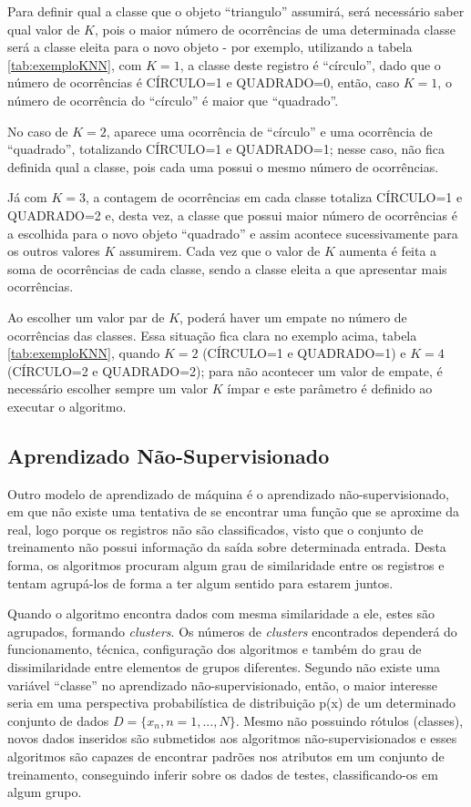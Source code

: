  
Para definir qual a classe que o objeto ``triangulo'' assumirá, será necessário saber qual valor de ${K}$, pois o maior número de ocorrências de uma determinada classe será a classe eleita para o novo objeto - por exemplo, utilizando a tabela \ref{tab:exemploKNN}, com ${K=1}$, a classe deste registro é “círculo”, dado que o número de ocorrências é CÍRCULO=1 e QUADRADO=0, então, caso ${K=1}$, o número de ocorrência do “círculo” é maior que ``quadrado''. 

No caso de ${K=2}$, aparece uma ocorrência de “círculo” e uma ocorrência de “quadrado”, totalizando CÍRCULO=1 e QUADRADO=1; nesse caso, não fica definida qual a classe, pois cada uma possui o mesmo número de ocorrências. 

Já com ${K=3}$, a contagem de ocorrências em cada classe totaliza CÍRCULO=1 e QUADRADO=2 e, desta vez, a classe que possui maior número de ocorrências é a escolhida para o novo objeto ``quadrado'' e assim acontece sucessivamente para os outros valores ${K}$ assumirem. Cada vez que o valor de ${K}$ aumenta é feita a soma de ocorrências de cada classe, sendo a classe eleita a que apresentar mais ocorrências. 
 

Ao escolher um valor par de ${K}$, poderá haver um empate no número de ocorrências das classes. Essa situação fica clara no exemplo acima, tabela \ref{tab:exemploKNN}, quando ${K=2}$  (CÍRCULO=1 e QUADRADO=1) e ${K=4}$  (CÍRCULO=2 e QUADRADO=2); para não acontecer um valor de empate, é necessário escolher sempre um valor ${K}$ ímpar e este parâmetro é definido ao executar o algoritmo. 

\subsection{Aprendizado Não-Supervisionado}\label{ssec:aprendNSup}

Outro modelo de aprendizado de máquina é o aprendizado não-supervisionado, em que não existe uma tentativa de se encontrar uma função que se aproxime da real, logo porque os registros não são classificados, visto que o conjunto de treinamento não possui informação da saída sobre determinada entrada. Desta forma, os algoritmos procuram algum grau de similaridade entre os registros e tentam agrupá-los de forma a ter algum sentido para estarem juntos.

Quando o algoritmo encontra dados com mesma similaridade a ele, estes são agrupados, formando \textit{clusters}. Os números de \textit{clusters} encontrados dependerá do funcionamento, técnica, configuração dos algoritmos e também do grau de dissimilaridade entre elementos de grupos diferentes. Segundo  não existe uma variável “classe” no aprendizado não-supervisionado, então, o maior interesse seria em uma perspectiva probabilística de distribuição p(x) de um determinado conjunto de dados ${D = \{x_{n},n=1,...,N\}}$. Mesmo não possuindo rótulos (classes), novos dados inseridos são submetidos aos algoritmos não-supervisionados e esses algoritmos são capazes de encontrar padrões nos atributos em um conjunto de treinamento, conseguindo inferir sobre os dados de testes, classificando-os em algum grupo.

